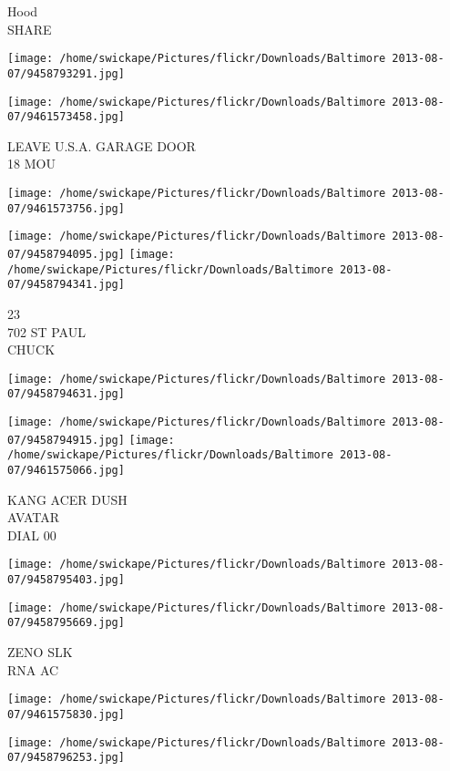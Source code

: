 \documentclass[10pt,letterpaper]{article}
\begin{document}
Hood\\
SHARE
\pagebreak

\texttt{[image: /home/swickape/Pictures/flickr/Downloads/Baltimore 2013-08-07/9458793291.jpg]}

\vspace{0.25in}
\texttt{[image: /home/swickape/Pictures/flickr/Downloads/Baltimore 2013-08-07/9461573458.jpg]}

LEAVE U.S.A. GARAGE DOOR\\
18 MOU
\pagebreak

\texttt{[image: /home/swickape/Pictures/flickr/Downloads/Baltimore 2013-08-07/9461573756.jpg]}

\vspace{0.25in}
\texttt{[image: /home/swickape/Pictures/flickr/Downloads/Baltimore 2013-08-07/9458794095.jpg]}
\texttt{[image: /home/swickape/Pictures/flickr/Downloads/Baltimore 2013-08-07/9458794341.jpg]}

23\\
702 ST PAUL\\
CHUCK
\pagebreak

\texttt{[image: /home/swickape/Pictures/flickr/Downloads/Baltimore 2013-08-07/9458794631.jpg]}

\vspace{0.25in}
\texttt{[image: /home/swickape/Pictures/flickr/Downloads/Baltimore 2013-08-07/9458794915.jpg]}
\texttt{[image: /home/swickape/Pictures/flickr/Downloads/Baltimore 2013-08-07/9461575066.jpg]}

KANG ACER DUSH\\
AVATAR\\
DIAL 00
\pagebreak

\texttt{[image: /home/swickape/Pictures/flickr/Downloads/Baltimore 2013-08-07/9458795403.jpg]}

\vspace{0.25in}
\texttt{[image: /home/swickape/Pictures/flickr/Downloads/Baltimore 2013-08-07/9458795669.jpg]}

ZENO SLK\\
RNA AC
\pagebreak

\texttt{[image: /home/swickape/Pictures/flickr/Downloads/Baltimore 2013-08-07/9461575830.jpg]}

\vspace{0.25in}
\texttt{[image: /home/swickape/Pictures/flickr/Downloads/Baltimore 2013-08-07/9458796253.jpg]}
\end{document}
